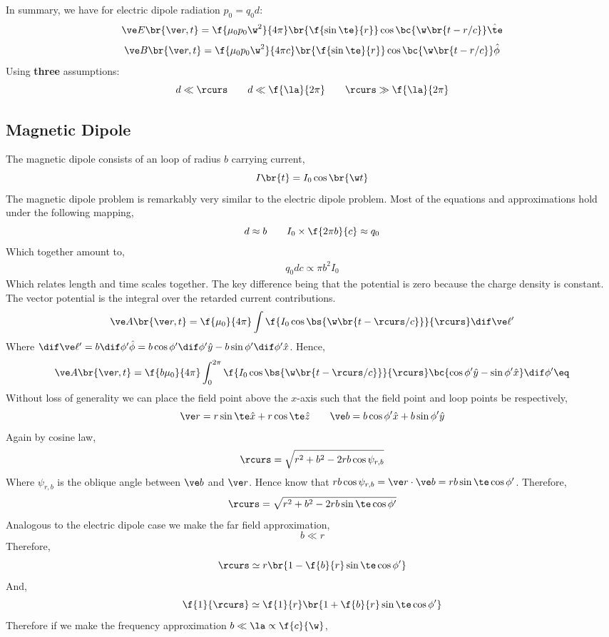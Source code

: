 \documentclass{article}
\begin{document}
In summary, we have for electric dipole radiation $p_0 = q_0 d$:
\[ \ve E\br{\ve r, t} =  \f{\mu_0 p_0 \w^2}{4 \pi} \br{\f{\sin \te}{r}}\cos \bc{\w \br{t - r/ c}}\hat \te\]
\[ \ve B\br{\ve r, t} =  \f{\mu_0 p_0 \w^2}{4 \pi c} \br{\f{\sin \te}{r}} \cos \bc{\w \br{t - r/ c}}\hat \phi \]
Using \textbf{three} assumptions:
\[ d \ll \rcurs \qquad d \ll \f{\la}{2\pi} \qquad \rcurs \gg \f{\la}{2 \pi} \]

\subsection{Magnetic Dipole}
The magnetic dipole consists of an loop of radius $b$ carrying current,
\[ I\br{t} = I_0 \cos \br{\w t} \]
The magnetic dipole problem is remarkably very similar to the electric dipole problem. Most of the equations and approximations hold under the following mapping,
\[ d \approx b \qquad I_0 \times \f{2 \pi b}{c} \approx q_0 \]
Which together amount to,
\begin{align*}
    q_0 d c \propto \pi b^2 I_0
\end{align*}
Which relates length and time scales together. The key difference being that the potential is zero because the charge density is constant.
The vector potential is the integral over the retarded current contributions.
\[ \ve A \br{\ve r, t} = \f{\mu_0}{4 \pi} \int \f{I_0 \cos\bs{\w\br{t - \rcurs / c}}}{\rcurs} \dif \ve \ell' \]
Where $\dif \ve \ell' = b \dif \phi' \hat \phi = b \cos \phi' \dif \phi'\hat y - b \sin \phi'\dif \phi' \hat x$. Hence,
\[ \ve A \br{\ve r, t} = \f{b\mu_0}{4 \pi} \int_{0}^{2\pi} \f{I_0 \cos\bs{\w\br{t - \rcurs / c}}}{\rcurs} \bc{\cos \phi'\hat y - \sin \phi' \hat x} \dif \phi' \eq \label{eq:A_magnetic_dipole}\]
Without loss of generality we can place the field point above the $x$-axis such that the field point and loop points be respectively,
\[ \ve r = r \sin \te \hat x + r \cos \te \hat z \qquad \ve b = b \cos \phi' \hat x + b \sin \phi' \hat y \]
Again by cosine law,
\[ \rcurs = \sqrt{r^2 + b^2 - 2 r b \cos \psi_{r,b}} \]
Where $\psi_{r,b}$ is the oblique angle between $\ve b$ and $\ve r$. Hence know that $r b \cos \psi_{r, b} = \ve r \cdot \ve b = rb \sin \te \cos \phi'$. Therefore,
\[ \rcurs = \sqrt{r^2 + b^2 - 2 r b \sin \te \cos \phi'} \]
Analogous to the electric dipole case we make the far field approximation,
\[ b \ll r \]
Therefore,
\[ \rcurs \simeq r\br{1 - \f{b}{r}\sin \te \cos \phi'} \]
And,
\[ \f{1}{\rcurs} \simeq \f{1}{r}\br{1 + \f{b}{r}\sin \te \cos \phi'} \]
Therefore if we make the frequency approximation $b \ll \la \propto \f{c}{\w}$,
\end{document}
